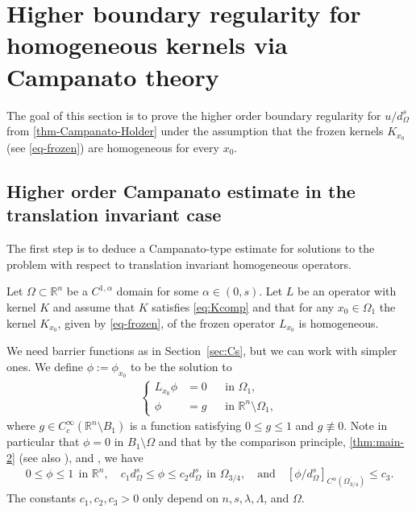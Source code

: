 \documentclass[11pt,reqno]{amsart}
\theoremstyle{plain}
\theoremstyle{definition}
\numberwithin{equation}{section}
\newcommand{\R}{\mathbb{R}}
\newcommand{\1}{\mathbbm{1}}
\begin{document}
\section{Higher boundary regularity for homogeneous kernels via Campanato theory}
\label{sec:homCs}

The goal of this section is to prove the higher order boundary regularity for $u/d_{\Omega}^s$ from \autoref{thm-Campanato-Holder} under the assumption that the frozen kernels $K_{x_0}$ (see \eqref{eq-frozen}) are homogeneous for every $x_0$.




\subsection{Higher order Campanato estimate in the translation invariant case}


The first step is to deduce a Campanato-type estimate for solutions to the problem with respect to translation invariant homogeneous operators.

Let $\Omega \subset \R^n$ be a $C^{1,\alpha}$ domain for some $\alpha \in (0,s)$. Let $L$ be an operator with kernel $K$ and assume that $K$ satisfies \eqref{eq:Kcomp} and that for any $x_0 \in \Omega_1$ the kernel $K_{x_0}$, given by \eqref{eq-frozen}, of the frozen operator $L_{x_0}$ is homogeneous.

We need barrier functions as in Section~\ref{sec:Cs}, but we can work with simpler ones. We define $\phi := \phi_{x_0}$ to be the solution to
\begin{align*}
\left\{
\begin{aligned}
L_{x_0} \phi &= 0 &&\text{in } \Omega_1 ,\\
\phi &= g &&\text{in } \R^n \setminus \Omega_1,
\end{aligned}
\right.
\end{align*}
where $g \in C^{\infty}_c(\R^n \setminus B_1)$ is a function satisfying $0 \le g \le 1$ and $g \not\equiv 0$. Note in particular that $\phi=0$ in $B_1 \setminus \Omega$ and that by the comparison principle, \autoref{thm:main-2} (see also \cite[Propositions~2.6.4 and 2.6.6]{FeRo24}), and \cite[Proposition 2.7.8]{FeRo24}, we have
\begin{align}
\label{eq:phi-properties}
0\le \phi \le 1~~\text{in }\R^n, \quad c_1 d_{\Omega}^s \le \phi \le c_2 d_{\Omega}^s ~~ \text{in } \Omega_{3/4}, \quad\text{and}\quad [\phi/d^s_{\Omega}]_{C^{\alpha}(\overline{\Omega_{3/4}})} \le c_3.
\end{align}
The constants $c_1,c_2, c_3 > 0$ only depend on $n,s,\lambda,\Lambda$, and $\Omega$.
\end{document}
